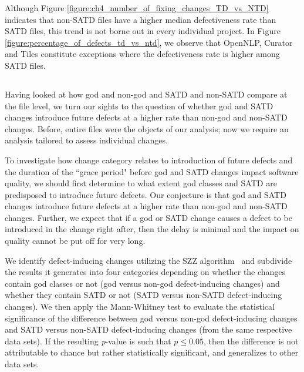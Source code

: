 Although Figure \ref{figure:ch4_number_of_fixing_changes_TD_vs_NTD} indicates that non-SATD files have a higher median defectiveness rate than SATD files, this trend is not borne out in every individual project. In Figure \ref{figure:percentage_of_defects_td_vs_ntd}, we observe that OpenNLP, Curator and Tiles constitute exceptions where the defectiveness rate is higher among SATD files.


\subsection*{\chapterIVrqII}


Having looked at how god and non-god and SATD and non-SATD compare at the file level, we turn our sights to the question of whether god and SATD changes introduce future defects at a higher rate than non-god and non-SATD changes. Before, entire files were the objects of our analysis; now we require an analysis tailored to assess individual changes.


To investigate how change category relates to introduction of future defects and the duration of the ``grace period" before god and SATD changes impact software quality, we should first determine to what extent god classes and SATD are predisposed to introduce future defects. Our conjecture is that god and SATD changes introduce future defects at a higher rate than non-god and non-SATD changes. Further, we expect that if a god or SATD change causes a defect to be introduced in the change right after, then the delay is minimal and the impact on quality cannot be put off for very long.


We identify defect-inducing changes utilizing the SZZ algorithm~\cite{sliwerski-msr-2005} and subdivide the results it generates into four categories depending on whether the changes contain god classes or not (god versus non-god defect-inducing changes) and whether they contain SATD or not (SATD versus non-SATD defect-inducing changes). \revision We then apply the Mann-Whitney test \cite{mann1947test} to evaluate the statistical significance of the difference between god versus non-god defect-inducing changes and SATD versus non-SATD defect-inducing changes (from the same respective data sets). If the resulting \textit{p}-value is such that $p \le 0.05$, then the difference is not attributable to chance but rather statistically significant, and generalizes to other data sets.


